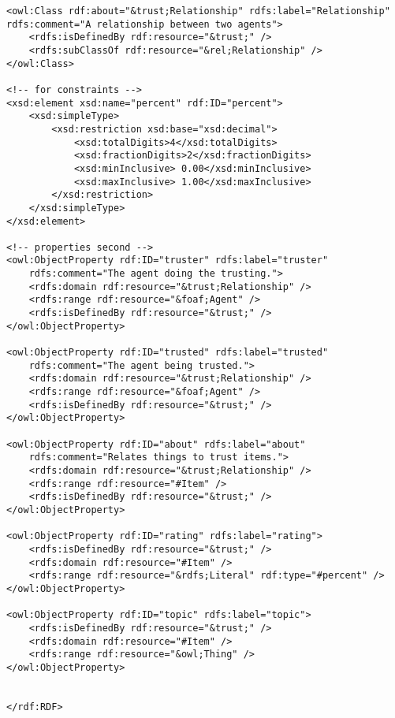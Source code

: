 \documentclass[onecolumn]{acm_proc_article-sp}
\begin{document}
\begin{verbatim}
<owl:Class rdf:about="&trust;Relationship" rdfs:label="Relationship" rdfs:comment="A relationship between two agents">
    <rdfs:isDefinedBy rdf:resource="&trust;" />
    <rdfs:subClassOf rdf:resource="&rel;Relationship" />
</owl:Class>

<!-- for constraints -->
<xsd:element xsd:name="percent" rdf:ID="percent">
    <xsd:simpleType>
        <xsd:restriction xsd:base="xsd:decimal">
            <xsd:totalDigits>4</xsd:totalDigits>
            <xsd:fractionDigits>2</xsd:fractionDigits>
            <xsd:minInclusive> 0.00</xsd:minInclusive>
            <xsd:maxInclusive> 1.00</xsd:maxInclusive>
        </xsd:restriction>
    </xsd:simpleType>
</xsd:element>

<!-- properties second -->
<owl:ObjectProperty rdf:ID="truster" rdfs:label="truster"
    rdfs:comment="The agent doing the trusting.">
    <rdfs:domain rdf:resource="&trust;Relationship" />
    <rdfs:range rdf:resource="&foaf;Agent" />
    <rdfs:isDefinedBy rdf:resource="&trust;" />
</owl:ObjectProperty>

<owl:ObjectProperty rdf:ID="trusted" rdfs:label="trusted"
    rdfs:comment="The agent being trusted.">
    <rdfs:domain rdf:resource="&trust;Relationship" />
    <rdfs:range rdf:resource="&foaf;Agent" />
    <rdfs:isDefinedBy rdf:resource="&trust;" />
</owl:ObjectProperty>

<owl:ObjectProperty rdf:ID="about" rdfs:label="about" 
    rdfs:comment="Relates things to trust items.">
    <rdfs:domain rdf:resource="&trust;Relationship" />
    <rdfs:range rdf:resource="#Item" />
    <rdfs:isDefinedBy rdf:resource="&trust;" />
</owl:ObjectProperty>

<owl:ObjectProperty rdf:ID="rating" rdfs:label="rating">
    <rdfs:isDefinedBy rdf:resource="&trust;" />
    <rdfs:domain rdf:resource="#Item" />
    <rdfs:range rdf:resource="&rdfs;Literal" rdf:type="#percent" />
</owl:ObjectProperty>

<owl:ObjectProperty rdf:ID="topic" rdfs:label="topic">
    <rdfs:isDefinedBy rdf:resource="&trust;" />
    <rdfs:domain rdf:resource="#Item" />
    <rdfs:range rdf:resource="&owl;Thing" />
</owl:ObjectProperty>


</rdf:RDF>
\end{verbatim}

\twocolumn

\balancecolumns
\end{document}
